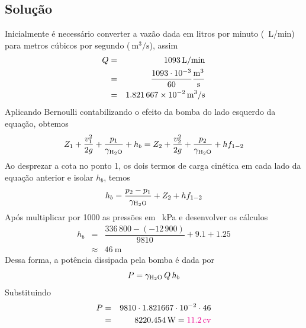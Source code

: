 \documentclass[a4paper, 12pt, brazilian]{article}
\begin{document}
	\subsection{Solução}
	Inicialmente é necessário converter a vazão dada em litros por minuto (\SI{}{\liter/\minute}) para metros cúbicos por segundo ($\SI{}{\meter^{3}/\second}$), assim
	\begin{eqnarray}
		Q&=&\SI{1093}{\liter/\minute}\\
		 &=&\dfrac{1093\cdot 10^{-3}}{60}\SI{}{\dfrac{\meter^{3}}{\second}}\\
		 &=&\SI{1.821667e-2}{\meter^{3}/\second}
	\end{eqnarray}
	Aplicando Bernoulli contabilizando o efeito da bomba do lado esquerdo da equação, obtemos
	\begin{equation}
		Z_{1}+\dfrac{v_{1}^{2}}{2g}+\dfrac{p_{1}}{\gamma_{\ce{H2O}}}+h_{b}=Z_{2}+\dfrac{v_{2}^{2}}{2g}+\dfrac{p_{2}}{\gamma_{\ce{H2O}}}+hf_{1-2}\\
	\end{equation}
	Ao desprezar a cota no ponto 1, os dois termos de carga cinética em cada lado da equação anterior e isolar $h_{b}$, temos
	\begin{equation}
		h_{b}=\dfrac{p_{2}-p_{1}}{\gamma_{\ce{H2O}}}+Z_{2}+hf_{1-2}
	\end{equation}
	Após multiplicar por 1000 as pressões em \SI{}{\kilo\pascal} e desenvolver os cálculos
	\begin{eqnarray}
		h_{b}&=&\dfrac{336\,800-(-12\,900)}{9810}+9.1+1.25\\
			 &\approx&\SI{46}{\meter}
	\end{eqnarray}
	Dessa forma, a potência dissipada pela bomba é dada por
	\begin{equation}
		P=\gamma_{\ce{H2O}}\,Q\,h_{b}
	\end{equation}
	Substituindo
	\begin{eqnarray}
		P&=&9810\cdot 1.821667\cdot 10^{-2}\cdot 46\\
		 &=&\SI{8220.454}{\watt}=\textcolor{magenta}{\SI{11.2}{cv}}
	\end{eqnarray}
\end{document}
